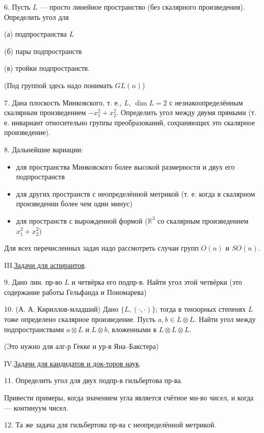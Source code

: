 6. Пусть \(L\) — просто линейное пространство (без скалярного произведения). Определить угол для

(а) подпространства \(L\)

(б) пары подпространств

(в) тройки подпространств.

(Под группой здесь надо понимать \(GL(n)\))

7. Дана плоскость Минковского, т. е., \(L\), \(\dim L=2\)
с незнакоопределённым скалярным произведением \(-x_1^2+x_2^2\).
Определить угол между двумя прямыми (т. е. инвариант относительно группы преобразований, сохраняющих это скалярное произведение).

8. Дальнейшие вариации:
\begin{itemize}
\item[—] для пространства Минковского более высокой размерности и двух его подпространств
\item[—] для других пространств с неопределённой метрикой (т. е. когда в скалярном произведении более чем один минус)
\item[—] для пространств с вырожденной формой (\(\mathbb R^3\) со скалярным произведением \(x_1^2+x_2^2\))
\end{itemize}

Для всех перечисленных задач надо рассмотреть случаи групп \(O(n)\) и \(SO(n)\).

\par\noindent III.\quad\uline{Задачи для аспирантов}.

9. Дано лин. пр-во \(L\) и четвёрка его подпр-в.
Найти угол этой четвёрки (это содержание работы Гельфанда и Пономарева)

10. (А. А. Кириллов-младший) Дано \(\{L,(\cdot,\cdot)\}\);
тогда в тензорных степенях \(L\) тоже определено скалярное произведение. Пусть \(a,b\in L\otimes L\).
Найти угол между подпространствами \(a\otimes L\) и \(L\otimes b\),
вложенными в \(L\otimes L\otimes L\).

(Это нужно для алг-р Гекке и ур-я Яна–Бакстера)


\noindent IV.\quad\uline{Задачи для кандидатов и док-торов наук}.

11. Определить угол для двух подпр-в гильбертова пр-ва.

Привести примеры, когда значением угла является счётное мн-во чисел, и когда — континуум чисел.

12. Та же задача для гильбертова пр-ва с неопределённой метрикой.


